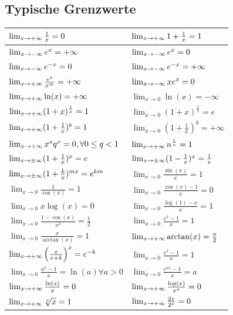 \documentclass[a4paper,8pt]{extarticle}
\begin{document}
\subsection{Typische Grenzwerte}
\begin{center}
  \begin{tabular}[]{|l|l|}
    \hline
    $\lim_{x\to +\infty} \frac{1}{x} = 0$ & $\lim_{x\to +\infty} 1 + \frac{1}{x} = 1$ \\
    \hline
    $\lim_{x\to -\infty} e^x = +\infty$ & $\lim_{x\to -\infty} e^x = 0$ \\
    \hline
    $\lim_{x\to -\infty} e^{-x} = 0$ & $\lim_{x\to -\infty} e^{-x} = +\infty$ \\
    \hline
    $\lim_{x\to +\infty} \frac{e^x}{x^m} = +\infty$ & $\lim_{x\to -\infty} x e^x = 0$ \\
    \hline
    $\lim_{x\to +\infty} \ln(x) = +\infty$ & $\lim_{x \to 0} \ln(x) = -\infty$ \\
    \hline
    $\lim_{x\to +\infty} (1 + x)^{\frac{1}{x}} = 1$ & $\lim_{x \to 0} (1 + x)^{\frac{1}{x}} = e$ \\
    \hline
    $\lim_{x\to +\infty} (1 + \frac{1}{x})^b = 1$ &  $\lim_{x \to 0} (1 + \frac{1}{x})^b = +\infty$\\
    \hline
    $\lim_{x\to +\infty} x^aq^x = 0, \forall 0 \leq q < 1$ & $\lim_{x\to +\infty} n^{\frac{1}{n}} = 1$\\
    \hline
    $\lim_{x\to \pm \infty} (1 + \frac{1}{x})^x = e$ & $\lim_{x\to \pm \infty} (1 - \frac{1}{x})^x = \frac{1}{e}$ \\
    \hline
    $\lim_{x\to \pm \infty} (1 + \frac{k}{x})^{mx} = e^{km}$ & $\lim_{x \to 0} \frac{\sin(x)}{x} = 1$ \\
    \hline
    $\lim_{x \to 0} \frac{1}{\cos(x)} = 1$ & $\lim_{x \to 0} \frac{\cos(x) - 1}{x} = 0$ \\
    \hline
    $\lim_{x \to 0} x\log(x) = 0$ & $\lim_{x \to 0} \frac{\log(1) - x}{x} = 1$ \\
    \hline
    $\lim_{x \to 0} \frac{1 - \cos(x)}{x^2} = \frac{1}{2}$ & $\lim_{x \to 0} \frac{e^x - 1}{x} = 1$ \\
    \hline
    $\lim_{x \to 0} \frac{x}{\arctan(x)} = 1$ & $\lim_{x\to +\infty} \arctan(x) = \frac{\pi}{2}$ \\
    \hline
    $\lim_{x\to +\infty} \left( \frac{x}{x+k}  \right) ^x = e^{-k}$ & $\lim_{x \to 0} \frac{e^x - 1}{x} = 1$ \\
    \hline
    $\lim_{x \to 0} \frac{a^x - 1}{x} = \ln(a)  \forall a > 0$ & $\lim_{x \to 0} \frac{e^{ax}-1}{x} = a$ \\
    \hline
    $\lim_{x\to +\infty} \frac{\ln(x)}{x} = 0$ & $\lim_{x\to +\infty} \frac{\log(x)}{x^a} = 0$ \\
    \hline
    $\lim_{x\to +\infty} \sqrt[x]{x} = 1$ & $\lim_{x\to +\infty} \frac{2x}{2^x} = 0$ \\
    \hline
  \end{tabular}
\end{center}
\end{document}
